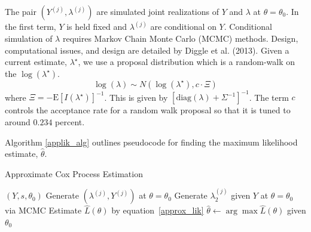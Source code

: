 \documentclass{acm_proc_article-sp}
\begin{document}
The pair $(Y^{(j)}, \lambda^{(j)})$ are simulated joint realizations of $Y$ and $\lambda$ at $\theta = \theta_0$.  In the first term, $Y$ is held fixed and $\lambda^{(j)}$ are conditional on $Y$.  Conditional simulation of $\lambda$ requires Markov Chain Monte Carlo (MCMC) methods.  Design, computational issues, and design are detailed by Diggle et al. (2013).  Given a current estimate, $\lambda^\star$, we use a proposal distribution which is a random-walk on the $\log (\lambda^\star)$.
\begin{equation*}
\log (\lambda) \sim N \left( \log \left( \lambda^\star\right) , c \cdot \Xi \right)
\end{equation*}
where $\Xi = - \text{E} \left[ I(\lambda^\star) \right]^{-1}$.  This is given by $\left[ \text{diag} \left( \lambda \right) + \Sigma^{-1} \right]^{-1}$.  The term $c$ controls the acceptance rate for a random walk proposal so that it is tuned to around $0.234$ percent.

Algorithm \ref{applik_alg} outlines pseudocode for finding the maximum likelihood estimate, $\hat{\theta}$.

\begin{algorithm}[!h]
\caption{Approximate Cox Process Estimation} \label{applik_alg}
\begin{algorithmic}
$(Y, s, \theta_0)$
\STATE Generate $(\lambda^{(j)}, Y^{(j)})$ at $\theta = \theta_0$
\STATE Generate $\lambda_2^{(j)}$ given $Y$ at $\theta = \theta_0$ via MCMC
\ENDFOR
\STATE Estimate $\hat{L} (\theta)$ by equation~\eqref{approx_lik}
\STATE $\hat{\theta} \gets \arg \max \hat{L} (\theta)$ given $\theta_0$
\end{algorithmic}
\end{algorithm}
\end{document}

